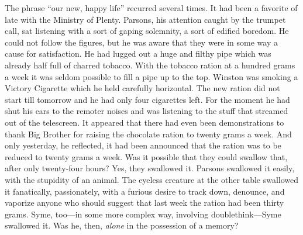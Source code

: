 The phrase ``our new, happy life'' recurred several times. It had been a
favorite of late with the Ministry of Plenty. Parsons, his attention
caught by the trumpet call, sat listening with a sort of gaping
solemnity, a sort of edified boredom. He could not follow the figures,
but he was aware that they were in some way a cause for satisfaction. He
had lugged out a huge and filthy pipe which was already half full of
charred tobacco. With the tobacco ration at a hundred grams a week it
was seldom possible to fill a pipe up to the top. Winston was smoking a
Victory Cigarette which he held carefully horizontal. The new ration did
not start till tomorrow and he had only four cigarettes left. For the
moment he had shut his ears to the remoter noises and was listening to
the stuff that streamed out of the telescreen. It appeared that there
had even been demonstrations to thank Big Brother for raising the
chocolate ration to twenty grams a week. And only yesterday, he
reflected, it had been announced that the ration was to be reduced to
twenty grams a week. Was it possible that they could swallow that, after
only twenty-four hours? Yes, they swallowed it. Parsons swallowed it
easily, with the stupidity of an animal. The eyeless creature at the
other table swallowed it fanatically, passionately, with a furious
desire to track down, denounce, and vaporize anyone who should suggest
that last week the ration had been thirty grams. Syme, too---in some
more complex way, involving doublethink---Syme swallowed it. Was he,
then, \emph{alone} in the possession of a memory?

